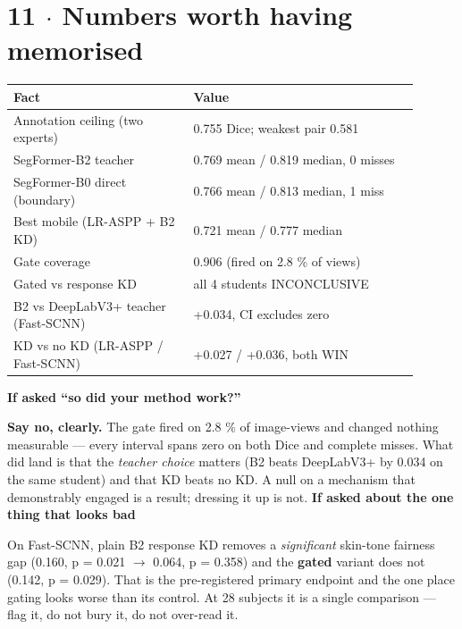 \documentclass[10pt,a4paper]{article}
\newcommand{\qq}[1]{\medskip\noindent\textbf{\color{navy}#1}\par\nobreak}
\begin{document}
\section*{11 $\cdot$ Numbers worth having memorised}
\begin{center}\small\begin{tabular}{p{0.4\linewidth}p{0.5\linewidth}}
\toprule
\textbf{Fact} & \textbf{Value} \\
\midrule
Annotation ceiling (two experts) & 0.755 Dice; weakest pair 0.581 \\
SegFormer-B2 teacher & 0.769 mean / 0.819 median, 0 misses \\
SegFormer-B0 direct (boundary) & 0.766 mean / 0.813 median, 1 miss \\
Best mobile (LR-ASPP + B2 KD) & 0.721 mean / 0.777 median \\
Gate coverage & 0.906 (fired on 2.8 \% of views) \\
Gated vs response KD & all 4 students INCONCLUSIVE \\
B2 vs DeepLabV3+ teacher (Fast-SCNN) & +0.034, CI excludes zero \\
KD vs no KD (LR-ASPP / Fast-SCNN) & +0.027 / +0.036, both WIN \\
\bottomrule\end{tabular}\end{center}
\qq{If asked ``so did your method work?''}
\textbf{Say no, clearly.} The gate fired on 2.8 \% of image-views and changed nothing measurable — every interval spans zero on both Dice and complete misses. What did land is that the \textit{teacher choice} matters (B2 beats DeepLabV3+ by 0.034 on the same student) and that KD beats no KD. A null on a mechanism that demonstrably engaged is a result; dressing it up is not.
\qq{If asked about the one thing that looks bad}
On Fast-SCNN, plain B2 response KD removes a \textit{significant} skin-tone fairness gap (0.160, p = 0.021 $\rightarrow$ 0.064, p = 0.358) and the \textbf{gated} variant does not (0.142, p = 0.029). That is the pre-registered primary endpoint and the one place gating looks worse than its control. At 28 subjects it is a single comparison — flag it, do not bury it, do not over-read it.
\end{document}
